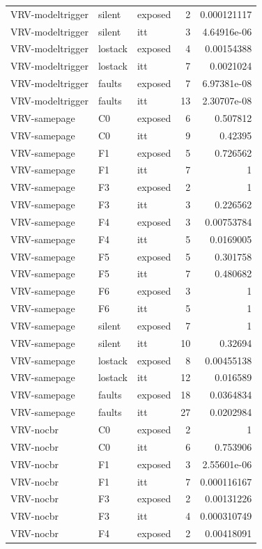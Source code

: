 \begin{tabular}{lllrr}
VRV-modeltrigger & silent & exposed & 2 & 0.000121117 \\
VRV-modeltrigger & silent & itt & 3 & 4.64916e-06 \\
VRV-modeltrigger & lostack & exposed & 4 & 0.00154388 \\
VRV-modeltrigger & lostack & itt & 7 & 0.0021024 \\
VRV-modeltrigger & faults & exposed & 7 & 6.97381e-08 \\
VRV-modeltrigger & faults & itt & 13 & 2.30707e-08 \\
VRV-samepage & C0 & exposed & 6 & 0.507812 \\
VRV-samepage & C0 & itt & 9 & 0.42395 \\
VRV-samepage & F1 & exposed & 5 & 0.726562 \\
VRV-samepage & F1 & itt & 7 & 1 \\
VRV-samepage & F3 & exposed & 2 & 1 \\
VRV-samepage & F3 & itt & 3 & 0.226562 \\
VRV-samepage & F4 & exposed & 3 & 0.00753784 \\
VRV-samepage & F4 & itt & 5 & 0.0169005 \\
VRV-samepage & F5 & exposed & 5 & 0.301758 \\
VRV-samepage & F5 & itt & 7 & 0.480682 \\
VRV-samepage & F6 & exposed & 3 & 1 \\
VRV-samepage & F6 & itt & 5 & 1 \\
VRV-samepage & silent & exposed & 7 & 1 \\
VRV-samepage & silent & itt & 10 & 0.32694 \\
VRV-samepage & lostack & exposed & 8 & 0.00455138 \\
VRV-samepage & lostack & itt & 12 & 0.016589 \\
VRV-samepage & faults & exposed & 18 & 0.0364834 \\
VRV-samepage & faults & itt & 27 & 0.0202984 \\
VRV-nocbr & C0 & exposed & 2 & 1 \\
VRV-nocbr & C0 & itt & 6 & 0.753906 \\
VRV-nocbr & F1 & exposed & 3 & 2.55601e-06 \\
VRV-nocbr & F1 & itt & 7 & 0.000116167 \\
VRV-nocbr & F3 & exposed & 2 & 0.00131226 \\
VRV-nocbr & F3 & itt & 4 & 0.000310749 \\
VRV-nocbr & F4 & exposed & 2 & 0.00418091 \\

\end{tabular}
